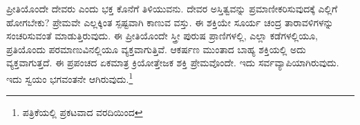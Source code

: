 ಪ್ರೀತಿಯೊಂದೇ ದೇವರು ಎಂದು ಭಕ್ತ ಕೊನೆಗೆ ತಿಳಿಯುವನು. ದೇವರ ಅಸ್ತಿತ್ವವನ್ನು ಪ್ರಮಾಣೀಕರಿಸುವುದಕ್ಕೆ ಎಲ್ಲಿಗೆ ಹೋಗಬೇಕು? ಪ್ರೇಮವೇ ಎಲ್ಲಕ್ಕಿಂತ ಸ್ಪಷ್ಟವಾಗಿ ಕಾಣುವ ವಸ್ತು. ಈ ಶಕ್ತಿಯೇ ಸೂರ್ಯ ಚಂದ್ರ ತಾರಾವಳಿಗಳನ್ನು ಸಂಚರಿಸುವಂತೆ ಮಾಡುತ್ತಿರುವುದು. ಈ ಪ್ರೀತಿಯೊಂದೇ ಸ್ತ್ರೀ ಪುರುಷ ಪ್ರಾಣಿಗಳಲ್ಲಿ, ಎಲ್ಲಾ ಕಡೆಗಳಲ್ಲಿಯೂ, ಪ್ರತಿಯೊಂದು ಪರಮಾಣುವಿನಲ್ಲಿಯೂ ವ್ಯಕ್ತವಾಗುತ್ತಿವೆ. ಆಕರ್ಷಣ ಮುಂತಾದ ಬಾಹ್ಯ ಶಕ್ತಿಯಲ್ಲಿ ಅದು ವ್ಯಕ್ತವಾಗುತ್ತದೆ. ಈ ಪ್ರಪಂಚದ ಏಕಮಾತ್ರ ಕ್ರಿಯೋತ್ತೇಜಕ ಶಕ್ತಿ ಪ್ರೇಮವೊಂದೇ. ಇದು ಸರ್ವವ್ಯಾಪಿಯಾಗಿರುವುದು. ಇದು ಸ್ವಯಂ ಭಗವಂತನೇ ಆಗಿರುವುದು.\footnote{ ಪತ್ರಿಕೆಯಲ್ಲಿ ಪ್ರಕಟವಾದ ವರದಿಯಿಂದ}

